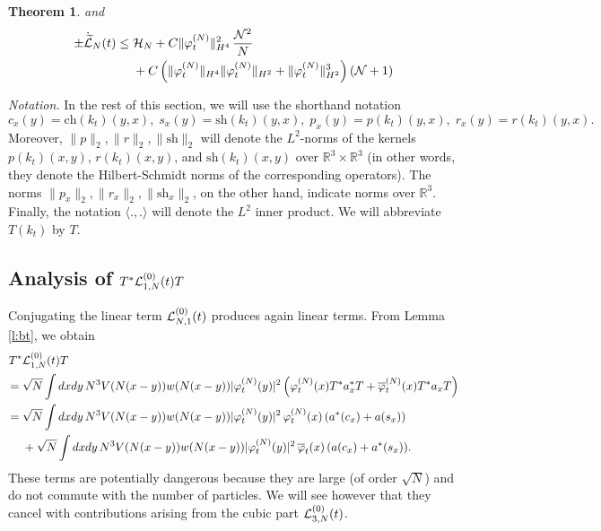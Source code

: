 \documentclass[11pt,a4paper]{article}
\newtheorem{thm}{Theorem}[section]  %
\newcommand{\bR}{{\mathbb R}}
\newcommand{\wt}{\widetilde}
\newcommand{\cH}{{\cal H}}
\newcommand{\cL}{{\cal L}}
\newcommand{\cN}{{\cal N}}
\begin{document}
\begin{thm}
and 
\begin{equation}\label{eq:thmL-3}
\begin{split} 
\pm \dot{\wt{\cL}}_N (t)  \leq \; &\cH_N + C \| \varphi_t^{(N)} \|_{H^4}^2 \, \frac{\cN^2}{N}  \\ &+ C \left( \| \varphi_t^{(N)} \|_{H^4}  \| \varphi_t^{(N)} \|_{H^2} + \| \varphi_t^{(N)} \|_{H^2}^3 \right) \left(\cN+1 \right)  
\end{split}
\end{equation}
\end{thm}

\bigskip

{\it Notation.} In the rest of this section, we will use the shorthand notation \begin{equation}\label{eq:def-csprx} 
c_x (y) = \text{ch} (k_t) (y,x), \;  s_x (y) = \text{sh} (k_t) (y,x), \; p_x (y) = p (k_t) (y,x), \; 
r_x (y) = r (k_t) (y,x). \end{equation}
Moreover, $\| p \|_2 , \| r \|_2, \|\text{sh} \|_2$ will denote the $L^2$-norms of the kernels $p (k_t) (x,y)$, $r (k_t) (x,y)$, and $\text{sh} (k_t) (x,y)$ over $\bR^3 \times \bR^3$ (in other words, they denote the Hilbert-Schmidt norms of the corresponding operators). The norms $\| p_x \|_2, \| r_x \|_2, \| \text{sh}_x \|_2$, on the other hand, indicate norms over $\bR^3$. Finally, the notation $\langle . , . \rangle$ will denote the $L^2$ inner product. We will abbreviate $T(k_t)$ by $T$.


\subsection{Analysis of $T^* \cL^{(0)}_{1,N} (t) T$}

Conjugating the linear term $\cL^{(0)}_{N,1} (t)$ produces again linear terms. {F}rom Lemma \ref{l:bt}, we obtain
\begin{equation}\label{eq:TL1T} \begin{split} T^* & \cL^{(0)}_{1,N} (t) T \\ = \; & \sqrt{N} \int dx dy \, N^3 V (N (x-y)) w (N (x-y)) |\varphi_t^{(N)} (y)|^2 \left( \varphi^{(N)}_t (x) T^* a^*_x T + \overline{\varphi}_t^{(N)} (x) T^* a_x T \right) \\ 
= \; &\sqrt{N} \int dx dy \, N^3 V (N (x-y)) w (N (x-y)) |\varphi_t^{(N)} (y)|^2 \, \varphi^{(N)}_t (x)  \, ( a^*(c_x) + a(s_x)) \\ &+ \sqrt{N} \int dx dy \, N^3 V (N (x-y)) w (N (x-y)) |\varphi_t^{(N)} (y)|^2 \, \overline{\varphi}_t (x)  \, ( a (c_x) + a^* (s_x)). \end{split} \end{equation}
These terms are potentially dangerous because they are large (of order $\sqrt{N}$) and do not commute with the number of particles. We will see however that they cancel with contributions arising from the cubic part $\cL_{3,N}^{(0)} (t)$. 
\end{document}
